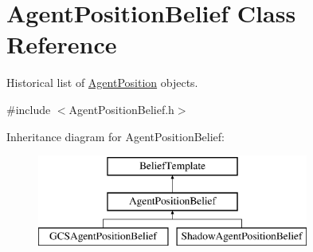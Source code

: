 \hypertarget{class_agent_position_belief}{
\section{AgentPositionBelief Class Reference}
\label{class_agent_position_belief}
}


Historical list of \hyperlink{class_agent_position}{AgentPosition} objects.  




{\ttfamily \#include $<$AgentPositionBelief.h$>$}

Inheritance diagram for AgentPositionBelief:\begin{figure}[H]
\begin{center}
\leavevmode
\includegraphics[height=3.000000cm]{class_agent_position_belief}
\end{center}
\end{figure}
